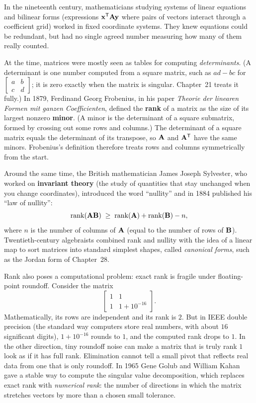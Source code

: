 \begin{historybox}
In the nineteenth century, mathematicians studying systems of linear equations and
bilinear forms (expressions $\mathbf{x}^{\mathsf{T}}\mathbf{A}\mathbf{y}$ where pairs of vectors interact
through a coefficient grid) worked in fixed coordinate systems. They knew
equations could be redundant, but had no single agreed number measuring how many
of them really counted.

At the time, matrices were mostly seen as tables for computing
\emph{determinants}. (A determinant is one number computed from a square matrix,
such as $ad-bc$ for $\left[\begin{smallmatrix} a & b\\ c & d\end{smallmatrix}\right]$; it is zero
exactly when the matrix is singular. Chapter~21 treats it fully.) In 1879,
Ferdinand Georg Frobenius, in his paper \emph{Theorie der linearen Formen mit
ganzen Coefficienten}, defined the \textbf{rank} of a matrix as the size of its
largest nonzero \textbf{minor}. (A minor is the determinant of a square
submatrix, formed by crossing out some rows and columns.) The determinant of a
square matrix equals the determinant of its transpose, so $\mathbf{A}$ and
$\mathbf{A}^{\mathsf{T}}$ have the same minors. Frobenius's definition therefore treats rows
and columns symmetrically from the start.

Around the same time, the British mathematician James Joseph Sylvester, who
worked on \textbf{invariant theory} (the study of quantities that stay unchanged
when you change coordinates), introduced the word ``nullity'' and in 1884
published his ``law of nullity'':
\[
  \operatorname{rank}(\mathbf{A}\mathbf{B}) \;\ge\; \operatorname{rank}(\mathbf{A}) + \operatorname{rank}(\mathbf{B}) - n,
\]
where $n$ is the number of columns of $\mathbf{A}$ (equal to the number of rows of
$\mathbf{B}$). Twentieth-century algebraists combined rank and nullity with the
idea of a linear map to sort matrices into standard simplest shapes, called
\emph{canonical forms}, such as the Jordan form of Chapter~28.

Rank also poses a computational problem: exact rank is fragile under
floating-point roundoff. Consider the matrix
\[
  \begin{bmatrix} 1 & 1 \\ 1 & 1 + 10^{-16} \end{bmatrix}.
\]
Mathematically, its rows are independent and its rank is $2$. But in IEEE
double precision (the standard way computers store real numbers, with about
$16$ significant digits), $1 + 10^{-16}$ rounds to $1$, and the computed rank
drops to $1$. In the other direction, tiny roundoff noise can make a matrix
that is truly rank $1$ look as if it has full rank. Elimination cannot tell a
small pivot that reflects real data from one that is only roundoff. In 1965
Gene Golub and William Kahan gave a stable way to compute the singular value
decomposition, which replaces exact rank with \emph{numerical rank}: the number
of directions in which the matrix stretches vectors by more than a chosen small
tolerance.
\end{historybox}

